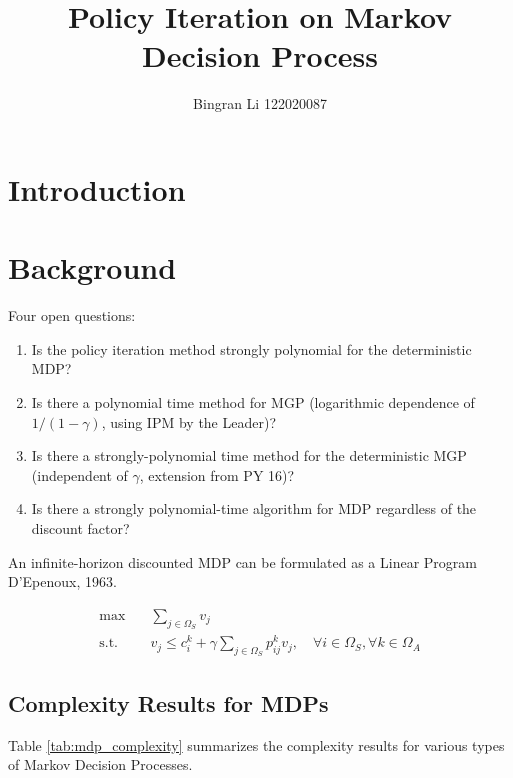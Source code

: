 \documentclass{article}
\title{Policy Iteration on Markov Decision Process}
\author{Bingran Li 122020087}
\begin{document}
\maketitle

\section{Introduction}

\section{Background}
Four open questions:
\begin{enumerate}
    \item Is the policy iteration method strongly polynomial for the deterministic MDP?
    \item Is there a polynomial time method for MGP (logarithmic dependence of $1/(1-\gamma)$, using IPM by the Leader)?
    \item Is there a strongly-polynomial time method for the deterministic MGP (independent of $\gamma$, extension from PY 16)?
    \item Is there a strongly polynomial-time algorithm for MDP regardless of the discount factor?
\end{enumerate}

An infinite-horizon discounted MDP can be formulated as a Linear Program D'Epenoux, 1963.

\begin{equation}
\begin{aligned}
    \max & \quad \sum_{j\in\Omega_S}v_j \\
    \text{s.t.} & \quad v_j \leq c_i^k + \gamma \sum_{j\in\Omega_S}p_{ij}^k v_j, \quad \forall i\in\Omega_S, \forall k\in\Omega_A
\end{aligned}
\end{equation}

\subsection{Complexity Results for MDPs}
Table \ref{tab:mdp_complexity} summarizes the complexity results for various types of Markov Decision Processes.
\end{document}
